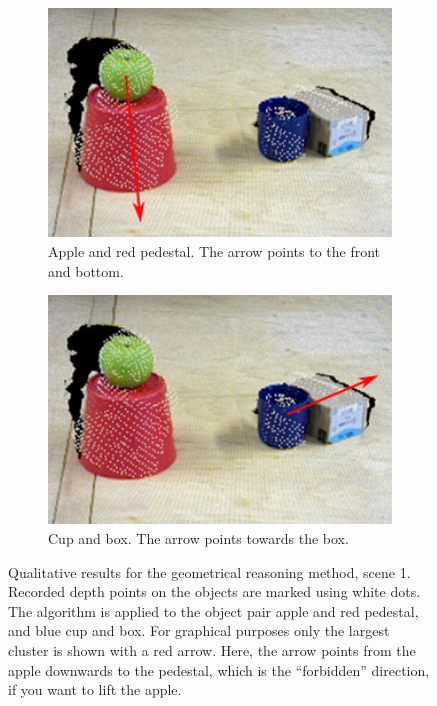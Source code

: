 \begin{figure}
  \centering
  \begin{subfigure}[t]{0.475\textwidth}
    \includegraphics[width=1.0\textwidth]{./figures/sec/geometrical_reasoning/affordance_arrow_scene4_1.jpg}
    \caption{Apple and red pedestal. The arrow points to the front and bottom.}
    \label{fig:sec_enriched_geometricalreasoning_experiments_scene1_1}
  \end{subfigure}
  \hfill
  \begin{subfigure}[t]{0.475\textwidth}
    \includegraphics[width=1.0\textwidth]{./figures/sec/geometrical_reasoning/affordance_arrow_scene4_2.png}
    \caption{Cup and box. The arrow points towards the box.}
    \label{fig:sec_enriched_geometricalreasoning_experiments_scene1_2}
  \end{subfigure}
  \caption{Qualitative results for the geometrical reasoning method, scene 1. Recorded depth points on the objects are marked using white dots. The algorithm is applied to the object pair apple and red pedestal, and blue cup and box. For graphical purposes only the lar\-gest cluster is shown with a red arrow. Here, the arrow points from the apple downwards to the pedestal, which is the ``forbidden'' direction, if you want to lift the apple.}
  \label{fig:sec_enriched_geometricalreasoning_experiments_scene1}
\end{figure}

